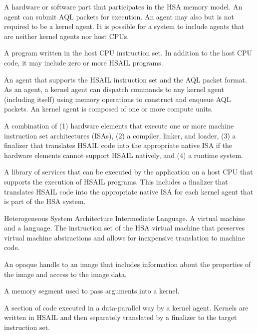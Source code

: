 \documentclass[final,oneside]{book}
\begin{document}
\begin{description}[itemsep=5pt,leftmargin=0cm, labelindent=0cm]
\item[Agent] A hardware or software part that participates in the HSA
  memory model. An agent can submit AQL packets for execution. An agent
  may also but is not required to be a kernel agent. It is possible for a
  system to include agents that are neither kernel agents nor host CPUs.

\item[HSA application] A program written in the host CPU instruction set. In
  addition to the host CPU code, it may include zero or more HSAIL programs.

\item[kernel agent] An agent that supports the HSAIL instruction set and the
  AQL packet format. As an agent, a kernel agent can dispatch commands to
  any kernel agent (including itself) using memory operations to construct and
  enqueue AQL packets. An kernel agent is composed of one or more compute units.

\item[HSA implementation] A combination of (1) hardware elements that execute
  one or more machine instruction set architectures (ISAs), (2) a compiler,
  linker, and loader, (3) a finalizer that translates HSAIL code into the
  appropriate native ISA if the hardware elements cannot support HSAIL
  natively, and (4) a runtime system.

\item[HSA runtime] A library of services that can be executed by the application
  on a host CPU that supports the execution of HSAIL programs. This includes a
  finalizer that translates HSAIL code into the appropriate native ISA for each
  kernel agent that is part of the HSA system.

\item[HSAIL] Heterogeneous System Architecture Intermediate Language. A virtual
  machine and a language. The instruction set of the HSA virtual machine that
  preserves virtual machine abstractions and allows for inexpensive translation
  to machine code.

\item[Image handle] An opaque handle to an image that includes information about
  the properties of the image and access to the image data.

\item[Kernarg segment] A memory segment used to pass arguments into a kernel.

\item[Kernel] A section of code executed in a data-parallel way by a kernel
  agent. Kernels are written in HSAIL and then separately translated by a
  finalizer to the target instruction set.


\end{description}
\end{document}
